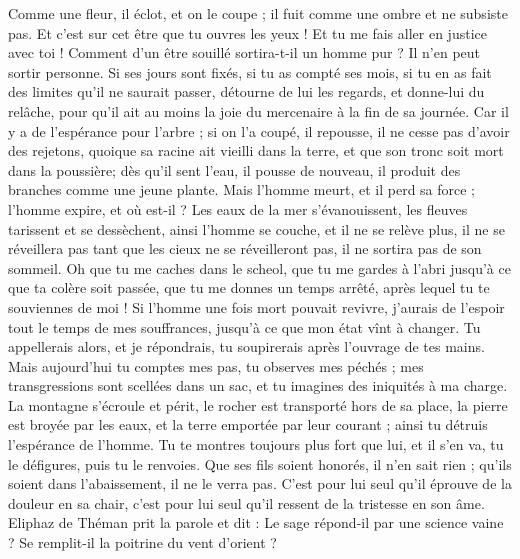 \begin{multicols}{2}
Comme une fleur, il éclot, et on le coupe ; il fuit comme une ombre et ne subsiste pas.
Et c'est sur cet être que tu ouvres les yeux ! Et tu me fais aller en justice avec toi !
Comment d'un être souillé sortira-t-il un homme pur ? Il n'en peut sortir personne.
Si ses jours sont fixés, si tu as compté ses mois, si tu en as fait des limites qu'il ne saurait passer,
détourne de lui les regards, et donne-lui du relâche, pour qu'il ait au moins la joie du mercenaire à la fin de sa journée.
Car il y a de l'espérance pour l'arbre ; si on l'a coupé, il repousse, il ne cesse pas d'avoir des rejetons,
quoique sa racine ait vieilli dans la terre, et que son tronc soit mort dans la poussière;
dès qu'il sent l'eau, il pousse de nouveau, il produit des branches comme une jeune plante.
Mais l'homme meurt, et il perd sa force ; l'homme expire, et où est-il ?
Les eaux de la mer s'évanouissent, les fleuves tarissent et se dessèchent,
ainsi l'homme se couche, et il ne se relève plus, il ne se réveillera pas tant que les cieux ne se réveilleront pas, il ne sortira pas de son sommeil.
Oh que tu me caches dans le scheol, que tu me gardes à l'abri jusqu'à ce que ta colère soit passée, que tu me donnes un temps arrêté, après lequel tu te souviennes de moi !
Si l'homme une fois mort pouvait revivre, j'aurais de l'espoir tout le temps de mes souffrances, jusqu'à ce que mon état vînt à changer.
Tu appellerais alors, et je répondrais, tu soupirerais après l'ouvrage de tes mains.
Mais aujourd'hui tu comptes mes pas, tu observes mes péchés ;
mes transgressions sont scellées dans un sac, et tu imagines des iniquités à ma charge.
La montagne s'écroule et périt, le rocher est transporté hors de sa place,
la pierre est broyée par les eaux, et la terre emportée par leur courant ; ainsi tu détruis l'espérance de l'homme.
Tu te montres toujours plus fort que lui, et il s'en va, tu le défigures, puis tu le renvoies.
Que ses fils soient honorés, il n'en sait rien ; qu'ils soient dans l'abaissement, il ne le verra pas.
C'est pour lui seul qu'il éprouve de la douleur en sa chair, c'est pour lui seul qu'il ressent de la tristesse en son âme.
\VerseOne{}Eliphaz de Théman prit la parole et dit :
Le sage répond-il par une science vaine ? Se remplit-il la poitrine du vent d'orient ?

\end{multicols}
